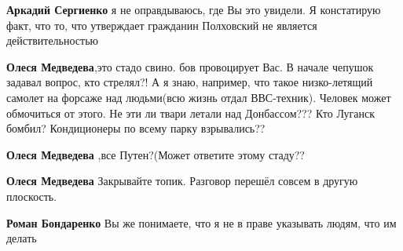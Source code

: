 \begin{itemize}
\begin{itemize}
 
\textbf{Аркадий Сергиенко} я не оправдываюсь, где Вы это увидели. Я констатирую
факт, что то, что утверждает гражданин Полховский не является действительностью

 
\textbf{Олеся Медведева},это стадо свино. бов провоцирует Вас. В начале чепушок
задавал вопрос, кто стрелял?! А я знаю, например, что такое низко-летящий
самолет на форсаже над людьми(всю жизнь отдал ВВС-техник). Человек может
обмочиться от этого. Не эти ли твари летали над Донбассом??? Кто Луганск
бомбил? Кондиционеры по всему парку взрывались??

 
\textbf{Олеся Медведева} ,все Путен?(Может ответите этому стаду??

 
\textbf{Олеся Медведева} Закрывайте топик. Разговор перешёл совсем в другую плоскость.

 
\textbf{Роман Бондаренко} Вы же понимаете, что я не в праве указывать людям, что им делать

 

\end{itemize}
\end{itemize}
